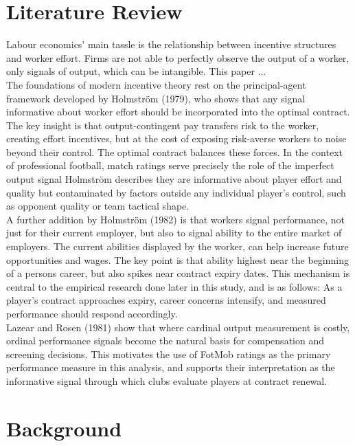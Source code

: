 \documentclass{article}
\begin{document}
\section{Literature Review}

Labour economics' main tassle is the relationship between incentive structures and worker effort. Firms are not able to perfectly observe the output of a worker, only signals of output, which can be intangible. This paper ... \\

The foundations of modern incentive theory rest on the principal-agent framework developed by Holmström (1979), who shows that any signal informative about worker effort should be incorporated into the optimal contract. The key insight is that output-contingent pay transfers risk to the worker, creating effort incentives, but at the cost of exposing risk-averse workers to noise beyond their control. The optimal contract balances these forces. In the context of professional football, match ratings serve precisely the role of the imperfect output signal Holmström describes they are informative about player effort and quality but contaminated by factors outside any individual player's control, such as opponent quality or team tactical shape. \\

A further addition by Holmström (1982) is that workers signal performance, not just for their current employer, but also to signal ability to the entire market of employers. The current abilities displayed by the worker, can help increase future opportunities and wages. The key point is that ability highest near the beginning of a persons career, but also spikes near contract expiry dates. This mechanism is central to the empirical research done later in this study, and is as follows: As a player's contract approaches expiry, career concerns intensify, and measured performance should respond accordingly. \\

Lazear and Rosen (1981) show that where cardinal output measurement is costly, ordinal performance signals become the natural basis for compensation and screening decisions. This motivates the use of FotMob ratings as the primary performance measure in this analysis, and supports their interpretation as the informative signal through which clubs evaluate players at contract renewal.






\section{Background}
\end{document}
